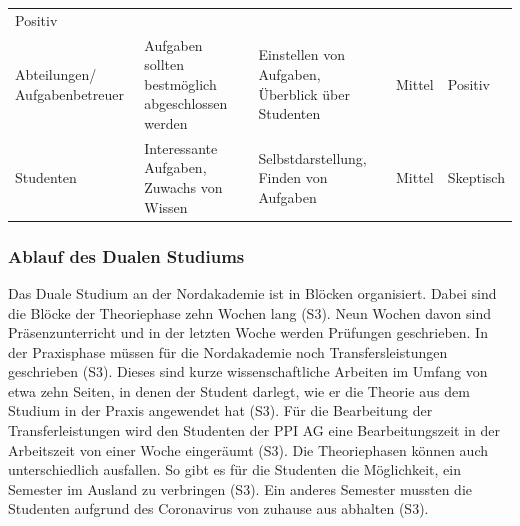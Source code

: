 \documentclass[
  12pt,
  ngerman,
  a4paper,
]{article}
\begin{document}
\begin{longtable}[]{@{}lllll@{}}
\begin{minipage}[t]{0.09\columnwidth}
Positiv\strut
\end{minipage}\tabularnewline
\begin{minipage}[t]{0.25\columnwidth}\raggedright
Abteilungen/ Aufgabenbetreuer\strut
\end{minipage} & \begin{minipage}[t]{0.23\columnwidth}\raggedright
Aufgaben sollten bestmöglich abgeschlossen werden\strut
\end{minipage} & \begin{minipage}[t]{0.22\columnwidth}\raggedright
Einstellen von Aufgaben, Überblick über Studenten\strut
\end{minipage} & \begin{minipage}[t]{0.07\columnwidth}\raggedright
Mittel\strut
\end{minipage} & \begin{minipage}[t]{0.09\columnwidth}\raggedright
Positiv\strut
\end{minipage}\tabularnewline
\begin{minipage}[t]{0.25\columnwidth}\raggedright
Studenten\strut
\end{minipage} & \begin{minipage}[t]{0.23\columnwidth}\raggedright
Interessante Aufgaben, Zuwachs von Wissen\strut
\end{minipage} & \begin{minipage}[t]{0.22\columnwidth}\raggedright
Selbstdarstellung, Finden von Aufgaben\strut
\end{minipage} & \begin{minipage}[t]{0.07\columnwidth}\raggedright
Mittel\strut
\end{minipage} & \begin{minipage}[t]{0.09\columnwidth}\raggedright
Skeptisch\strut
\end{minipage}\tabularnewline
\bottomrule
\end{longtable}

\hypertarget{ablauf-des-dualen-studiums}{%
\subsubsection{Ablauf des Dualen
Studiums}\label{ablauf-des-dualen-studiums}}

Das Duale Studium an der Nordakademie ist in Blöcken organisiert. Dabei
sind die Blöcke der Theoriephase zehn Wochen lang (S3). Neun Wochen
davon sind Präsenzunterricht und in der letzten Woche werden Prüfungen
geschrieben. In der Praxisphase müssen für die Nordakademie noch
Transfersleistungen geschrieben (S3). Dieses sind kurze
wissenschaftliche Arbeiten im Umfang von etwa zehn Seiten, in denen der
Student darlegt, wie er die Theorie aus dem Studium in der Praxis
angewendet hat (S3). Für die Bearbeitung der Transferleistungen wird den
Studenten der PPI AG eine Bearbeitungszeit in der Arbeitszeit von einer
Woche eingeräumt (S3). Die Theoriephasen können auch unterschiedlich
ausfallen. So gibt es für die Studenten die Möglichkeit, ein Semester im
Ausland zu verbringen (S3). Ein anderes Semester mussten die Studenten
aufgrund des Coronavirus von zuhause aus abhalten (S3).
\end{document}
